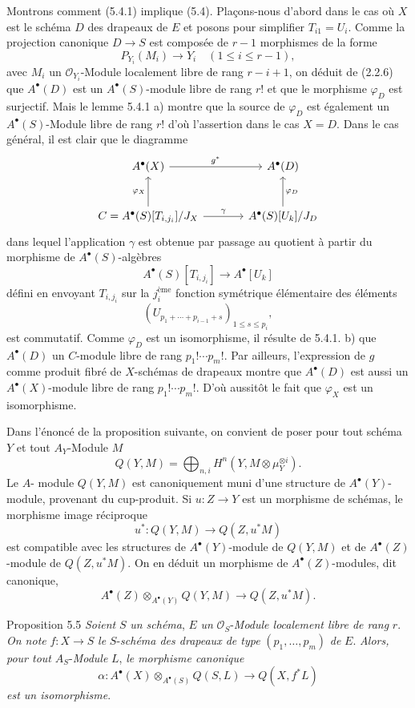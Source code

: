 Montrons comment (5.4.1) implique (5.4). Plaçons-nous d'abord dans le cas 
où $X$ est le
schéma $D$ des drapeaux de $E$ et posons pour simplifier $T_{i1}=U_i$. Comme la projection canonique $D\to S$ est composée de $r-1$ morphismes de la forme
\[
P_{Y_i}(M_i)\to Y_i\quad(1\le i\le r-1),
\]
avec $M_i$ un $\mathcal{O}_{Y_i}$-Module localement libre de rang $r-i+1$, on déduit de (2.2.6) que $A^{\bullet}(D)$ est un $A^{\bullet}(S)$-module libre de rang $r!$ et que le morphisme $\varphi_D$ est surjectif. Mais le lemme 5.4.1 a) montre que la source de $\varphi_D$ est également un $A^{\bullet}(S)$-Module libre de rang $r!$ d'où l'assertion dans le cas $X=D$. Dans le cas général, il est clair que le diagramme
\[
\begin{tikzcd}[column sep=large,row sep=large]
A^{\bullet}(X) \arrow[r,"g^*"] & A^{\bullet}(D)\\
C=A^{\bullet}(S)[T_{i,j_i}]/J_X \arrow[u,"\varphi_X"] \arrow[r,"\gamma"] &
A^{\bullet}(S)[U_k]/J_D \arrow[u,"\varphi_D"']
\end{tikzcd}
\]
dans lequel l'application $\gamma$ est obtenue par passage au quotient à partir du morphisme de $A^{\bullet}(S)$-algèbres
\[
A^\bullet(S)[T_{i,j_i}]\to A^\bullet[U_k]
\]
défini en envoyant $T_{i,j_i}$ sur la $j_i^{\text{ème}}$ fonction symétrique élémentaire des éléments
\[
(U_{p_1+\cdots+p_{i-1}+s})_{1\le s\le p_i},
\]
est commutatif. Comme $\varphi_D$ est un isomorphisme, il résulte de 5.4.1. b) que $A^{\bullet}(D)$ un $C$-module libre de rang $p_1!\cdots p_m!$. Par ailleurs, l'expression de $g$ comme produit fibré de $X$-schémas de drapeaux montre que $A^{\bullet}(D)$ est aussi un $A^{\bullet}(X)$-module libre de rang $p_1!\cdots p_m!$. D'où aussitôt le fait que $\varphi_X$ est un isomorphisme.

Dans l'énoncé de la proposition suivante, on convient de poser pour tout schéma $Y$ et tout $A_Y$-Module $M$
\[
Q(Y,M)=\bigoplus_{n,i}H^n(Y,M\otimes\mu_Y^{\otimes i}).
\]
Le $A$-
module $Q(Y,M)$ est canoniquement muni d'une structure de $A^\bullet(Y)$-module, provenant du cup-produit. Si $u:Z\to Y$ est un morphisme de schémas, le morphisme image réciproque
\[
u^*:Q(Y,M)\to Q(Z,u^*M)
\]
est compatible avec les structures de $A^\bullet(Y)$-module de $Q(Y,M)$ et de $A^\bullet(Z)$-module de $Q(Z,u^*M)$. On en déduit un morphisme de $A^\bullet(Z)$-modules, dit canonique,
\[
A^\bullet(Z)\otimes_{A^\bullet(Y)}Q(Y,M)\to Q(Z,u^*M).
\]

\begin{statement}{Proposition 5.5}
\emph{Soient} $S$ \emph{un schéma}, $E$ \emph{un} $\mathcal{O}_S$-\emph{Module localement libre de rang} $r$. \emph{On note} $f:X\to S$ \emph{le} $S$-\emph{schéma des drapeaux de type} $(p_1,\ldots,p_m)$ \emph{de} $E$. \emph{Alors, pour tout} $A_S$-\emph{Module} $L$, \emph{le morphisme canonique}
\[
\alpha:A^\bullet(X)\otimes_{A^\bullet(S)}Q(S,L)\to Q(X,f^*L)
\]
\emph{est un isomorphisme}.
\end{statement}

